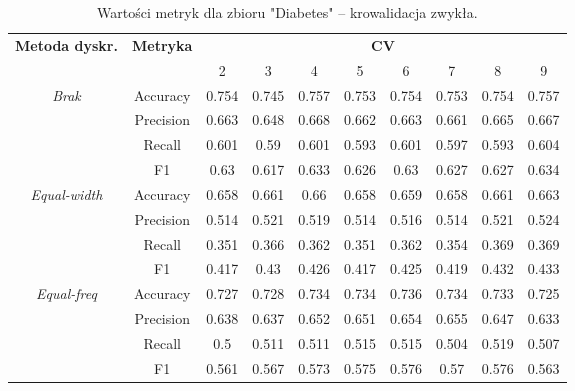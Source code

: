  \begin{table}[H]
    \center
    \caption{Wartości metryk dla zbioru "Diabetes" -- krowalidacja zwykła.}
    \begin{tabular}{|c|c|c|c|c|c|c|c|c|c|}
        \hline
        \multirow{2}{*}{\textbf{Metoda dyskr.}} & \multirow{2}{*}{\textbf{Metryka}} & \multicolumn{8}{|c|}{\textbf{CV}} \\ \cline{3-10}
                                                &  & 2 & 3 & 4 & 5 & 6 & 7 & 8 & 9 \\ \hline
            \multirow{4}{*}{\textit{Brak}}  & Accuracy & 0.754 & 0.745 & 0.757 & 0.753 & 0.754 & 0.753 & 0.754 & 0.757 \\ \cline{2-10}
                                             & Precision & 0.663 & 0.648 & 0.668 & 0.662 & 0.663 & 0.661 & 0.665 & 0.667 \\ \cline{2-10}
                                             & Recall & 0.601 & 0.59 & 0.601 & 0.593 & 0.601 & 0.597 & 0.593 & 0.604 \\ \cline{2-10}
                                             & F1 & 0.63 & 0.617 & 0.633 & 0.626 & 0.63 & 0.627 & 0.627 & 0.634 \\ \hline  \hline


                                            \multirow{4}{*}{\textit{Equal-width}}  & Accuracy & 0.658 & 0.661 & 0.66 & 0.658 & 0.659 & 0.658 & 0.661 & 0.663 \\ \cline{2-10}
                                             & Precision & 0.514 & 0.521 & 0.519 & 0.514 & 0.516 & 0.514 & 0.521 & 0.524 \\ \cline{2-10}
                                             & Recall & 0.351 & 0.366 & 0.362 & 0.351 & 0.362 & 0.354 & 0.369 & 0.369 \\ \cline{2-10}
                                             & F1 & 0.417 & 0.43 & 0.426 & 0.417 & 0.425 & 0.419 & 0.432 & 0.433 \\ \hline  \hline


                                            \multirow{4}{*}{\textit{Equal-freq}}  & Accuracy & 0.727 & 0.728 & 0.734 & 0.734 & 0.736 & 0.734 & 0.733 & 0.725 \\ \cline{2-10}
                                             & Precision & 0.638 & 0.637 & 0.652 & 0.651 & 0.654 & 0.655 & 0.647 & 0.633 \\ \cline{2-10}
                                             & Recall & 0.5 & 0.511 & 0.511 & 0.515 & 0.515 & 0.504 & 0.519 & 0.507 \\ \cline{2-10}
                                             & F1 & 0.561 & 0.567 & 0.573 & 0.575 & 0.576 & 0.57 & 0.576 & 0.563 \\ \hline  \hline



\end{tabular}
\end{table}
